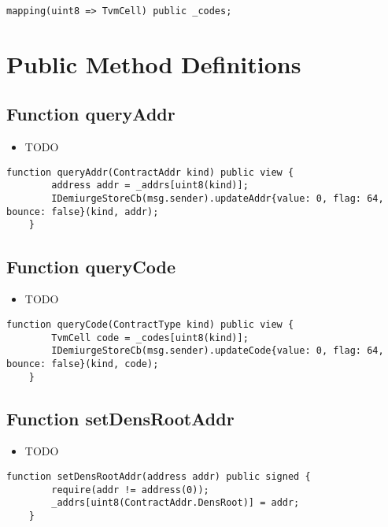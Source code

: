 \begin{lstlisting}[firstnumber=12]
    mapping(uint8 => TvmCell) public _codes;
\end{lstlisting}

\section{Public Method Definitions}


\subsection{Function queryAddr}

\begin{itemize}
\item TODO
\end{itemize}

\begin{lstlisting}[firstnumber=43]
    function queryAddr(ContractAddr kind) public view {
        address addr = _addrs[uint8(kind)];
        IDemiurgeStoreCb(msg.sender).updateAddr{value: 0, flag: 64, bounce: false}(kind, addr);
    }
\end{lstlisting}

\subsection{Function queryCode}

\begin{itemize}
\item TODO
\end{itemize}

\begin{lstlisting}[firstnumber=38]
    function queryCode(ContractType kind) public view {
        TvmCell code = _codes[uint8(kind)];
        IDemiurgeStoreCb(msg.sender).updateCode{value: 0, flag: 64, bounce: false}(kind, code);
    }
\end{lstlisting}

\subsection{Function setDensRootAddr}

\begin{itemize}
\item TODO
\end{itemize}

\begin{lstlisting}[firstnumber=21]
    function setDensRootAddr(address addr) public signed {
        require(addr != address(0));
        _addrs[uint8(ContractAddr.DensRoot)] = addr;
    }
\end{lstlisting}

